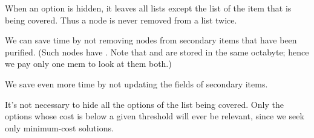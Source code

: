 When an option is hidden, it leaves all lists except the list of the
item that is being covered. Thus a node is never removed from a list
twice.

We can save time by not removing nodes from secondary items that have been
purified. (Such nodes have . Note that  and
 are
stored in the same octabyte; hence we pay only one mem to look at
them both.)

We save even more time by not updating the  fields of secondary
items.

It's not necessary to hide all the options of the list being covered.
Only the options whose cost is below a given threshold will ever
be relevant, since we seek only minimum-cost solutions.


